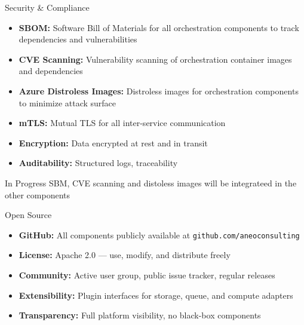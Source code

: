 \begin{frame}{Security \& Compliance}
	\begin{itemize}
		\item \textbf{SBOM:} Software Bill of Materials for all orchestration components to track dependencies and vulnerabilities
		\item \textbf{CVE Scanning:} Vulnerability scanning of orchestration container images and dependencies
		\item \textbf{Azure Distroless Images:} Distroless images for orchestration components to minimize attack surface
		\item \textbf{mTLS:} Mutual TLS for all inter-service communication
		\item \textbf{Encryption:} Data encrypted at rest and in transit
		\item \textbf{Auditability:} Structured logs, traceability
	\end{itemize}

	\begin{block}{In Progress}
		SBM, CVE scanning and distoless images will be integrateed in the other components
	\end{block}
\end{frame}

\begin{frame}{Open Source}
	\begin{itemize}
		\item \textbf{GitHub:} All components publicly available at \texttt{github.com/aneoconsulting}
		\item \textbf{License:} Apache 2.0 — use, modify, and distribute freely
		\item \textbf{Community:} Active user group, public issue tracker, regular releases
		\item \textbf{Extensibility:} Plugin interfaces for storage, queue, and compute adapters
		\item \textbf{Transparency:} Full platform visibility, no black-box components
	\end{itemize}
\end{frame}


